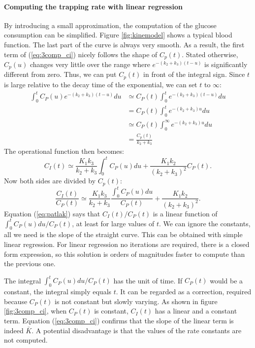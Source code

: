 \documentclass[11pt,oneside]{article}
\begin{document}
\paragraph{Computing the trapping rate with linear regression\\}
By introducing a small approximation, the computation of the glucose
consumption can be simplified. Figure \ref{fig:kinemodel} shows a typical
blood function. The last part of the curve is always very smooth. As a result,
the first term of (\ref{eq:3comp_ci}) nicely follows the shape of
$C_p(t)$. Stated otherwise, $C_p(u)$ changes very little over the range where
$e^{-(k_2 + k_3)(t - u)}$ is significantly different from zero. Thus, we can
put $C_p(t)$ in front of the integral sign. Since $t$ is large relative to the
decay time of the exponential, we can set $t$ to $\infty$:
\begin{align}
\int_0^t C_P(u) e^{-(k_2 + k_3)(t - u)}du
  &\simeq  C_P(t) \int_0^t  e^{-(k_2 + k_3)(t - u)}du\\
  &=       C_P(t) \int_0^t  e^{-(k_2 + k_3)u}du\\
  &\simeq  C_P(t) \int_0^\infty  e^{-(k_2 + k_3)u}du\\
  &= \frac{C_p(t)}{k_2 + k_3}
\end{align}
The operational function then becomes:
\begin{equation}
  C_I(t) \simeq \frac{K_1 k_3}{k_2 + k_3} \int_0^t C_P(u) du + 
  \frac{K_1 k_2}{(k_2 + k_3)^2} C_P(t).
\end{equation}
Now both sides are divided by $C_p(t)$:
\begin{equation}
  \frac{C_I(t)}{C_P(t)} \simeq 
    \frac{K_1 k_3}{k_2 + k_3} \frac{\int_0^t C_P(u) du}{C_P(t)} + 
  \frac{K_1 k_2}{(k_2 + k_3)^2}. \label{eq:patlak}
\end{equation}
Equation (\ref{eq:patlak}) says that $C_I(t)/C_P(t)$ is a linear function of
$\int_0^t C_P(u) du / C_P(t)$, at least for large values of $t$. We can ignore
the constants, all we need is the slope of the straight curve. This can be
obtained with simple linear regression. For linear regression no iterations
are required, there is a closed form expression, so this solution is orders of
magnitudes faster to compute than the previous one. 

The integral $\int_0^t C_P(u) du / C_P(t)$ has the unit of time. If $C_P(t)$
would be a constant, the integral simply equals $t$. It can be regarded as a
correction, required because $C_P(t)$ is not constant but slowly varying. As
shown in figure \ref{fig:3comp_ci}, when $C_P(t)$ is constant, $C_I(t)$ has
a linear and a constant term. Equation (\ref{eq:3comp_ci}) confirms that the
slope of the linear term is indeed $\bar{K}$. A potential disadvantage is that
the values of the rate constants are not computed.
\end{document}
